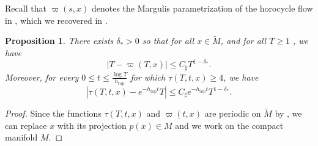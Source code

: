 \documentclass[11pt,letterpaper]{amsart}
\newcommand \tM {{\widetilde M}}
\newcommand \sC {{C_\sharp}}
\DeclareMathOperator{\topp}{top}
\newtheorem {proposition}[theorem]{Proposition}
\theoremstyle{definition}
\begin{document}
 
Recall that $\varpi(s,x)$ denotes the Margulis parametrization of the horocycle flow in , which we recovered in .


\begin{proposition}\label{prop:estimate_on_tau}
There exists $\delta_{\ast}>0$ so that for all $x \in \tM$, and for all $T\geq 1$
, we have
\[
\left\lvert T- \varpi(T,x)\right\rvert  \leq \sC T^{1-\delta_{\ast}}.
\]
Moreover, for every $0\leq t\leq \frac{\log T}{h_{\topp}}$ for which $\tau(T,t,x) \geq 4$, we have
\[
\left\lvert \tau(T,t,x) - e^{-h_{\topp}t}T \right\rvert \leq \sC e^{-h_{\topp}t}T^{1 -\delta_{\ast}}.
\]
\end{proposition}
\begin{proof}
Since the functions $\tau(T,t,x)$ and $\varpi(t,x)$ are periodic on $\tM$ by  , we can replace $x$ with its projection $p(x) \in M$ and we work on the compact manifold $M$.


\end{proof}
\end{document}
